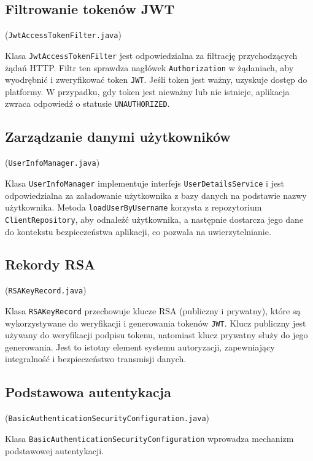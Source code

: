 \subsection{Filtrowanie tokenów JWT} (\texttt{JwtAccessTokenFilter.java})

Klasa \texttt{JwtAccessTokenFilter} jest odpowiedzialna za filtrację przychodzących żądań HTTP. Filtr ten sprawdza nagłówek \texttt{Authorization} w żądaniach, aby wyodrębnić i zweryfikować token \texttt{JWT}. Jeśli token jest ważny, uzyskuje dostęp do platformy. W przypadku, gdy token jest nieważny lub nie istnieje, aplikacja zwraca odpowiedź o statusie \texttt{UNAUTHORIZED}.

\subsection{Zarządzanie danymi użytkowników} (\texttt{UserInfoManager.java})

Klasa \texttt{UserInfoManager} implementuje interfejs \texttt{UserDetailsService} i jest odpowiedzialna za załadowanie użytkownika z bazy danych na podstawie nazwy użytkownika. Metoda \texttt{loadUserByUsername} korzysta z repozytorium \texttt{ClientRepository}, aby odnaleźć użytkownika, a następnie dostarcza jego dane do kontekstu bezpieczeństwa aplikacji, co pozwala na uwierzytelnianie.

\subsection{Rekordy RSA} (\texttt{RSAKeyRecord.java})

Klasa \texttt{RSAKeyRecord} przechowuje klucze RSA (publiczny i prywatny), które są wykorzystywane do weryfikacji i generowania tokenów \texttt{JWT}. Klucz publiczny jest używany do weryfikacji podpisu tokenu, natomiast klucz prywatny służy do jego generowania. Jest to istotny element systemu autoryzacji, zapewniający integralność i bezpieczeństwo transmisji danych.

\subsection{Podstawowa autentykacja} (\texttt{BasicAuthenticationSecurityConfiguration.java})

Klasa \texttt{BasicAuthenticationSecurityConfiguration} wprowadza mechanizm podstawowej autentykacji.
	
